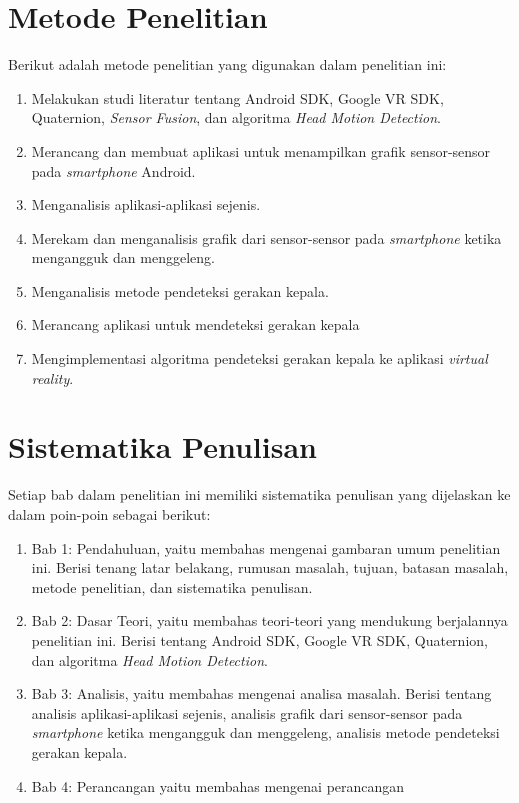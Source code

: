 \section{Metode Penelitian}

Berikut adalah metode penelitian yang digunakan dalam penelitian ini:
	\begin{enumerate}
		\item Melakukan studi literatur tentang Android SDK, Google VR SDK, Quaternion, \textit{Sensor Fusion}, dan algoritma \textit{Head Motion Detection}.
		\item Merancang dan membuat aplikasi untuk menampilkan grafik sensor-sensor pada \textit{smartphone} Android.
		\item Menganalisis aplikasi-aplikasi sejenis.
		\item Merekam dan menganalisis grafik dari sensor-sensor pada \textit{smartphone} ketika mengangguk dan menggeleng.
		\item Menganalisis metode pendeteksi gerakan kepala.
		\item Merancang aplikasi untuk mendeteksi gerakan kepala
		\item Mengimplementasi algoritma pendeteksi gerakan kepala ke aplikasi \textit{virtual reality}.
	\end{enumerate}
\section{Sistematika Penulisan}

Setiap bab dalam penelitian ini memiliki sistematika penulisan yang dijelaskan ke dalam poin-poin sebagai berikut:
\begin{enumerate}
	\item Bab 1: Pendahuluan, yaitu membahas mengenai gambaran umum penelitian ini. Berisi tenang latar belakang, rumusan masalah, tujuan, batasan masalah, metode penelitian, dan sistematika penulisan.
	\item Bab 2: Dasar Teori, yaitu membahas teori-teori yang mendukung berjalannya penelitian ini. Berisi tentang Android SDK, Google VR SDK, Quaternion, dan algoritma \textit{Head Motion Detection}.
	\item Bab 3: Analisis, yaitu membahas mengenai analisa masalah. Berisi tentang analisis aplikasi-aplikasi sejenis, analisis grafik dari sensor-sensor pada \textit{smartphone} ketika mengangguk dan menggeleng, analisis metode pendeteksi gerakan kepala. 
	\item Bab 4: Perancangan yaitu membahas mengenai perancangan
\end{enumerate}